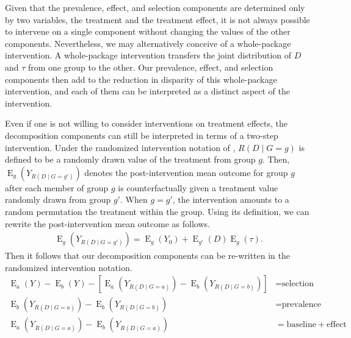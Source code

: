 \documentclass[12pt,a4paper]{article}
\newcommand{\E}{\operatorname{E}}
\begin{document}
Given that the prevalence, effect, and selection components are determined only by two variables, the treatment and the treatment effect, it is not always possible to intervene on a single component without changing the values of the other components. Nevertheless, we may alternatively conceive of a whole-package intervention. A whole-package intervention transfers the joint distribution of $D$ and $\tau$ from one group to the other. Our prevalence, effect, and selection components then add to the reduction in disparity of this whole-package intervention, and each of them can be interpreted as a distinct aspect of the intervention.

Even if one is not willing to consider interventions on treatment effects, the decomposition components can still be interpreted in terms of a two-step intervention. Under the randomized intervention notation of \citet{didelez_direct_2006}, $R(D \mid  G=g)$ is defined to be a randomly drawn value of the treatment from group $g$. Then, $\E_g \left(Y_{R(D \mid  G=g') } \right)$ denotes the post-intervention mean outcome for group $g$ after each member of group $g$ is counterfactually given a treatment value randomly drawn from  group $g'$. When $g=g'$, the intervention amounts to a random permutation the treatment within the group. Using its definition, we can rewrite the post-intervention mean outcome as follows.
\begin{align}
    \E_g \left(Y_{R(D \mid  G=g') } \right) = \E_g (Y_0) + \E_{g'}(D)\E_g(\tau). \label{eqt2}
\end{align}
Then it follows that our decomposition components can be re-written in the randomized intervention notation.
\begin{align*}
   \E_a(Y) - \E_b(Y) - \left[ \E_a \left(Y_{R(D \mid G=a)} \right) - \E_b \left(Y_{R(D \mid G=b)}\right) \right] &= \text{selection} \\
   \E_b \left(Y_{R(D \mid G=a)} \right)-\E_b \left(Y_{R(D \mid G=b)} \right)  &= \text{prevalence} \\
   \E_a \left(Y_{R(D \mid G=a)} \right)-\E_b \left(Y_{R(D \mid G=a)} \right)  &= \text{baseline} + \text{effect} 
\end{align*}
\end{document}
